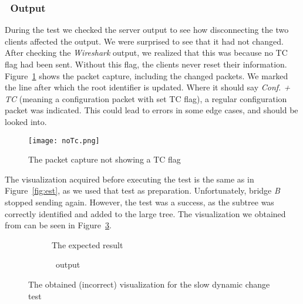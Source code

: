 \subsubsection*{\tool\ Output}
During the test we checked the server output to see how disconnecting the two clients affected the output.
We were surprised to see that it had not changed.
After checking the \textit{Wireshark} output, we realized that this was because no TC flag had been sent.
Without this flag, the clients never reset their information.
Figure~\ref{fig:noTc} shows the packet capture, including the changed packets.
We marked the line after which the root identifier is updated.
Where it should say \textit{Conf. + TC} (meaning a configuration packet with set TC flag), a regular configuration packet was indicated.
This could lead to errors in some edge cases, and should be looked into.
\begin{figure}[h]
    \centering
    \texttt{[image: noTc.png]}
    \caption{The packet capture not showing a TC flag}
    \label{fig:noTc}
\end{figure}


The visualization acquired before executing the test is the same as in Figure~\ref{fig:est}, as we used that test as preparation.
Unfortunately, bridge \textit{B} stopped sending again.
However, the test was a success, as the subtree was correctly identified and added to the large tree.
The visualization we obtained from \tool can be seen in Figure~\ref{fig:dynAfter}.
\begin{figure}[h]
    \begin{subfigure}[b]{\textwidth}
        \centering
        \caption{The expected result}
        \label{fig:sdcTest5}
    \end{subfigure}
       
    \vspace{0.5cm}

    \begin{subfigure}[b]{\textwidth}
        \centering
        
        \caption{\tool\ output}
    \end{subfigure}
    \caption{The obtained (incorrect) visualization for the slow dynamic change test}
    \label{fig:dynAfter}
\end{figure}

